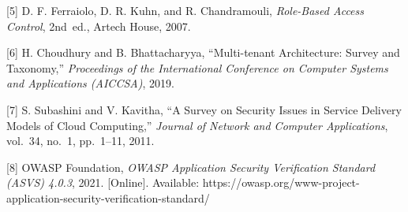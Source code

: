 \documentclass[11pt]{article}
\begin{document}
{[}5{]} D. F. Ferraiolo, D. R. Kuhn, and R. Chandramouli,
\emph{Role-Based Access Control}, 2nd~ed., Artech House, 2007.

{[}6{]} H. Choudhury and B. Bhattacharyya, ``Multi-tenant Architecture:
Survey and Taxonomy,'' \emph{Proceedings of the International
Conference on Computer Systems and Applications (AICCSA)}, 2019.

{[}7{]} S. Subashini and V. Kavitha, ``A Survey on Security Issues in
Service Delivery Models of Cloud Computing,'' \emph{Journal of Network
and Computer Applications}, vol.~34, no.~1, pp.~1--11, 2011.

{[}8{]} OWASP Foundation, \emph{OWASP Application Security Verification
Standard (ASVS) 4.0.3}, 2021. [Online]. Available:
https://owasp.org/www-project-application-security-verification-standard/
\end{document}

